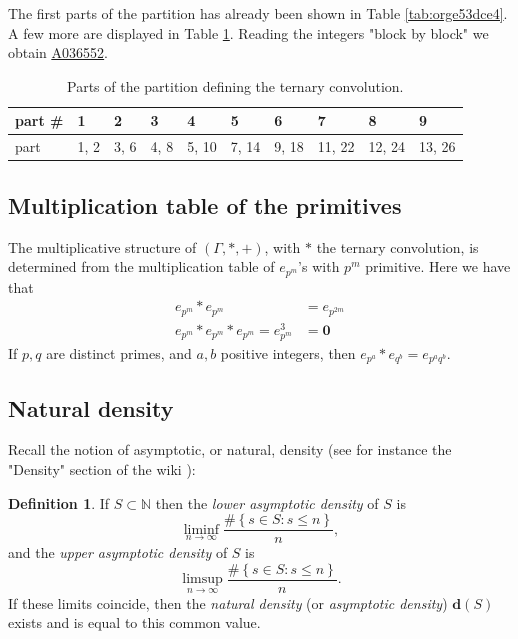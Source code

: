 \documentclass[12pt]{article}
\theoremstyle{definition}
\newtheorem{definition}{Definition}
\theoremstyle{remark}
\theoremstyle{plain}
\newcommand\setsuchas[2]{\left\{{#1}:{#2}\right\}}
\newcommand{\NN}{{\mathbb{N}}}
\newcommand{\seqnum}[1]{\href{https://oeis.org/#1}{\textrm \underline{#1}}}
\newcommand{\dens}{\mathbf{d}}
\begin{document}
The first parts of the partition has already been shown in 
Table \ref{tab:orge53dce4}.
A few more are displayed in
Table \ref{tab:org297cd36}.
Reading the integers "block by block" we obtain \seqnum{A036552}.

\begin{table}[ptbh]
\caption{\label{tab:org297cd36}Parts of the partition defining the ternary convolution.}
\centering
\begin{tabular}{l|l|l|l|l|l|l|l|l|l}
part \# & 1 & 2 & 3 & 4 & 5 & 6 & 7 & 8 & 9\\
\hline
part & 1, 2 & 3, 6 & 4, 8 & 5, 10 & 7, 14 & 9, 18 & 11, 22 & 12, 24 & 13, 26\\
\end{tabular}
\end{table}
\subsection{Multiplication table of the primitives}
\label{sec:org2664034}
The multiplicative structure of \((\Gamma,*,+)\), with \(*\) the ternary convolution,
is determined from the multiplication table of \(e_{{p^{m}}}\)'s with \(p^{m}\) primitive.
Here we have that
\begin{equation}
\label{eq:orgc7842dd}
\begin{split}
  e_{p^{m}} * e_{p^{m}} &= e_{p^{2m}} \\
  e_{p^{m}} * e_{p^{m}} * e_{p^{m}} = e_{p^{m}}^{3} & =  \mathbf{0} 
\end{split}
\end{equation}
If \(p,q\) are distinct primes, and \(a,b\) positive integers, then
\(e_{{p^{a}}} * e_{{q^{b}}} = e_{{p^{a}}{q^{b}}}\).
\subsection{Natural density}
\label{sec:org13dc707}
Recall the notion of asymptotic, or natural, density (see for instance the "Density" section of the wiki \cite{oeis}):
\begin{definition}
If \(S \subset \NN\) then the \emph{lower asymptotic density}  of \(S\) is
\[\liminf_{{n \to \infty}} \frac{\# \setsuchas{s \in S}{s \le n}}{n},\]
and the \emph{upper asymptotic density}  of \(S\) is
\[\limsup_{{n \to \infty}} \frac{\# \setsuchas{s \in S}{s \le n}}{n}.\]
If these limits coincide, then the \emph{natural density} (or \emph{asymptotic density}) \(\dens(S)\) exists and is
equal to this common value.
\end{definition}
\end{document}
